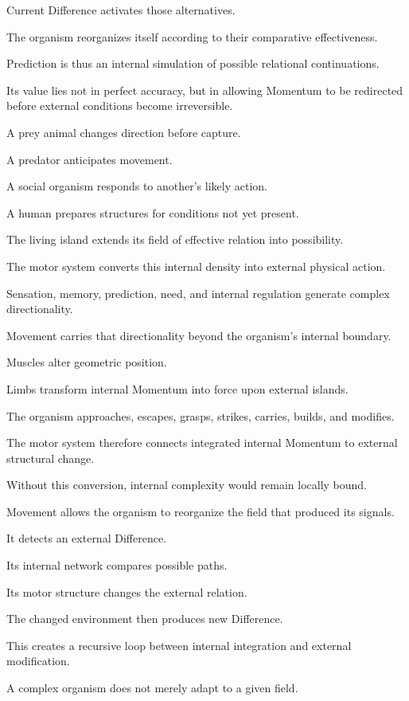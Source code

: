 Current Difference activates those alternatives.

The organism reorganizes itself according to their comparative effectiveness.

Prediction is thus an internal simulation of possible relational continuations.

Its value lies not in perfect accuracy, but in allowing Momentum to be redirected before external conditions become irreversible.

A prey animal changes direction before capture.

A predator anticipates movement.

A social organism responds to another’s likely action.

A human prepares structures for conditions not yet present.

The living island extends its field of effective relation into possibility.

The motor system converts this internal density into external physical action.

Sensation, memory, prediction, need, and internal regulation generate complex directionality.

Movement carries that directionality beyond the organism’s internal boundary.

Muscles alter geometric position.

Limbs transform internal Momentum into force upon external islands.

The organism approaches, escapes, grasps, strikes, carries, builds, and modifies.

The motor system therefore connects integrated internal Momentum to external structural change.

Without this conversion, internal complexity would remain locally bound.

Movement allows the organism to reorganize the field that produced its signals.

It detects an external Difference.

Its internal network compares possible paths.

Its motor structure changes the external relation.

The changed environment then produces new Difference.

This creates a recursive loop between internal integration and external modification.

A complex organism does not merely adapt to a given field.

